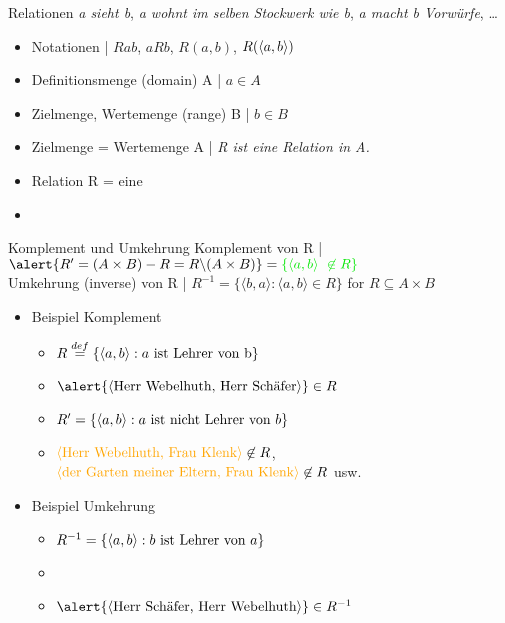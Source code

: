 \begin{frame}
  {Relationen}
  \onslide<+->
  \onslide<+->
  \textit{a sieht b}, \textit{a wohnt im selben Stockwerk wie b}, \textit{a macht b Vorwürfe}, \ldots\\
  \Halbzeile
  \begin{itemize}[<+->]
    \item Notationen | \alert{$Rab$, $aRb$, $R(a,b)$, $R(\langle{}a,b\rangle)$}
    \item Definitionsmenge (domain) A | \alert{$a\in A$}
    \item Zielmenge, Wertemenge (range) B | \alert{$b\in B$}
    \item Zielmenge = Wertemenge A | \textit{R ist eine Relation in A.}
      \Halbzeile
    \item Relation R = eine 
    \item {}
  \end{itemize}
\end{frame}

\begin{frame}
  {Komplement und Umkehrung}
  \onslide<+->
  \onslide<+->
  Komplement von R | $\alert{R^{\prime}=(A\times B)-R=R\backslash(A\times B)}=\gruen{\{\langle a,b\rangle\ \not\in R\}}$ \\
  \onslide<+->
  Umkehrung (inverse) von R | \alert{$R^{-1}=\{\langle b,a\rangle:\langle a,b\rangle\in R\}$  for $R\subseteq A\times B$}\\
  \Halbzeile
  \begin{itemize}[<+->]
    \item Beispiel Komplement
      \begin{itemize}[<+->]
        \item $R\stackrel{def}{=}\{\langle{}a,b\rangle: a\text{ ist Lehrer von b}\}$
        \item $\alert{\tuple{\text{Herr Webelhuth, Herr Schäfer}}}\in R$
        \item $R^{\prime}=\{\langle{}a,b\rangle: a\text{ ist nicht Lehrer von }b\}$
        \item $\orongsch{\tuple{\text{Herr Webelhuth, Frau Klenk}}}\not\in R$,\\
          $\orongsch{\tuple{\text{der Garten meiner Eltern, Frau Klenk}}}\not\in R$ usw.
      \end{itemize}
      \Halbzeile
    \item Beispiel Umkehrung
      \begin{itemize}[<+->]
        \item $R^{-1}=\{\langle{}a,b\rangle:b\text{ ist Lehrer von }a\}$
        \item {}
        \item $\alert{\tuple{\text{Herr Schäfer, Herr Webelhuth}}}\in R^{-1}$
      \end{itemize}
  \end{itemize}
\end{frame}

